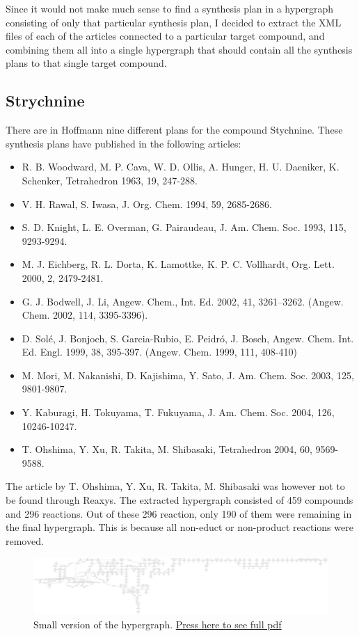 \documentclass[a4paper,10pt,titlepage]{paper}
\begin{document}
Since it would not make much sense to find a synthesis plan in a hypergraph consisting of only that particular synthesis plan, I decided to extract the XML files of each of the articles connected to a particular target compound, and combining them all into a single hypergraph that should contain all the synthesis plans to that single target compound. 
\subsection{Strychnine}
There are in Hoffmann\cite{SynthesisPlans} nine different plans for the compound Stychnine. These synthesis plans have published in the following articles:
\begin{itemize}
\item
R. B. Woodward, M. P. Cava, W. D. Ollis, A. Hunger, H. U. Daeniker, K. Schenker,
Tetrahedron 1963, 19, 247-288.
\item
V. H. Rawal, S. Iwasa, J. Org. Chem. 1994, 59, 2685-2686.
\item
S. D. Knight, L. E. Overman, G. Pairaudeau, J. Am. Chem. Soc. 1993, 115,
9293-9294.
\item
M. J. Eichberg, R. L. Dorta, K. Lamottke, K. P. C. Vollhardt, Org. Lett. 2000, 2,
2479-2481.
\item
G. J. Bodwell, J. Li, Angew. Chem., Int. Ed. 2002, 41, 3261–3262. (Angew. Chem.
2002, 114, 3395-3396).
\item
D. Solé, J. Bonjoch, S. Garcia-Rubio, E. Peidró, J. Bosch, Angew. Chem. Int. Ed.
Engl. 1999, 38, 395-397. (Angew. Chem. 1999, 111, 408-410)
\item
M. Mori, M. Nakanishi, D. Kajishima, Y. Sato, J. Am. Chem. Soc. 2003, 125,
9801-9807.
\item
Y. Kaburagi, H. Tokuyama, T. Fukuyama, J. Am. Chem. Soc. 2004, 126,
10246-10247.
\item
T. Ohshima, Y. Xu, R. Takita, M. Shibasaki, Tetrahedron 2004, 60, 9569-9588.
\end{itemize}
The article by T. Ohshima, Y. Xu, R. Takita, M. Shibasaki was however not to be found through Reaxys. The extracted hypergraph consisted of 459 compounds and 296 reactions. Out of these 296 reaction, only 190 of them were remaining in the final hypergraph. This is because all non-educt or non-product reactions were removed.
\begin{figure}[H]
\centering
\includegraphics[scale=0.03, angle=90]{Synteseplaner/Strychnine/Output.pdf}
\caption{Small version of the hypergraph. \href{Synteseplaner/Strychnine/Output.pdf}{Press here to see full pdf}}
\end{figure} 
\end{document}
